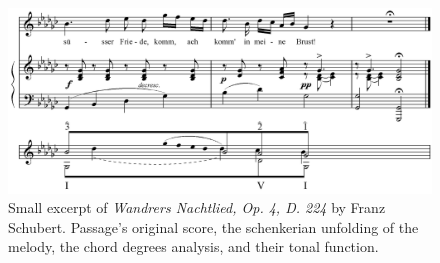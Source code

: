 \begin{figure}[ht]
\includegraphics[clip,width=\columnwidth]{figures/schenkerian analysis/SchubertOp4no3.png}%
\caption[Excerpt of \textit{Wandrers Nachtlied, Op. 4, D. 224} by Franz Schubert.]{\small{Small excerpt of \textit{Wandrers Nachtlied, Op. 4, D. 224} by Franz Schubert. Passage's original score, the schenkerian unfolding of the melody, the chord degrees analysis, and their tonal function.}}
\label{fig:Wandrers Nachtlied, Op. 4, D. 224}
\end{figure}